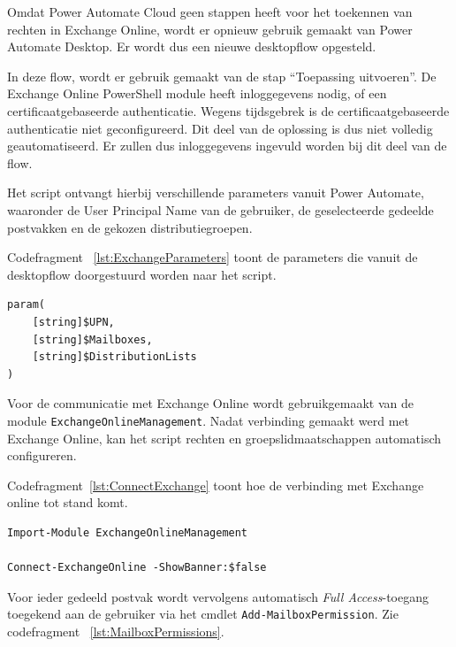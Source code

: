 Omdat Power Automate Cloud geen stappen heeft voor het toekennen van rechten in Exchange Online, wordt er opnieuw gebruik gemaakt van Power Automate Desktop. Er wordt dus een nieuwe desktopflow opgesteld. 

In deze flow, wordt er gebruik gemaakt van de stap ``Toepassing uitvoeren''. De Exchange Online PowerShell module heeft inloggegevens nodig, of een certificaatgebaseerde authenticatie. Wegens tijdsgebrek is de certificaatgebaseerde authenticatie niet geconfigureerd. Dit deel van de oplossing is dus niet volledig geautomatiseerd. Er zullen dus inloggegevens ingevuld worden bij dit deel van de flow.

Het script ontvangt hierbij verschillende parameters vanuit Power Automate, waaronder de User Principal Name van de gebruiker, de geselecteerde gedeelde postvakken en de gekozen distributiegroepen.

Codefragment ~\ref{lst:ExchangeParameters} toont de parameters die vanuit de desktopflow doorgestuurd worden naar het script.

\begin{listing}[ht]
\begin{verbatim}
param(
    [string]$UPN,
    [string]$Mailboxes,
    [string]$DistributionLists
)
\end{verbatim}
\caption{Parameters voor Exchange Online-configuratie}
\label{lst:ExchangeParameters}
\end{listing}

Voor de communicatie met Exchange Online wordt gebruikgemaakt van de module \texttt{ExchangeOnlineManagement}. Nadat verbinding gemaakt werd met Exchange Online, kan het script rechten en groepslidmaatschappen automatisch configureren.

Codefragment~\ref{lst:ConnectExchange} toont hoe de verbinding met Exchange online tot stand komt. 

\begin{listing}[ht]
\begin{verbatim}
Import-Module ExchangeOnlineManagement

Connect-ExchangeOnline -ShowBanner:$false
\end{verbatim}
\caption{Verbinding met Exchange Online}
\label{lst:ConnectExchange}
\end{listing}

Voor ieder gedeeld postvak wordt vervolgens automatisch \textit{Full Access}-toegang toegekend aan de gebruiker via het cmdlet \texttt{Add-MailboxPermission}. Zie codefragment ~\ref{lst:MailboxPermissions}.

